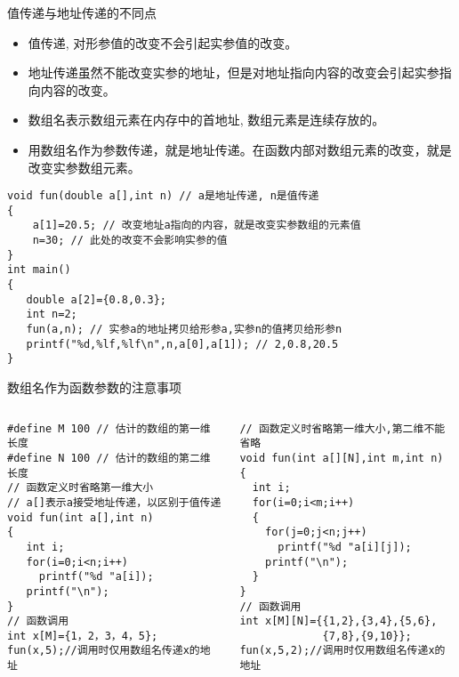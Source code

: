 \begin{frame}{值传递与地址传递的不同点}
\vspace{-0.2cm}
\begin{itemize}
	\item 值传递, 对形参值的改变不会引起实参值的改变。
	\item 地址传递虽然不能改变实参的地址，但是对地址指向内容的改变会引起实参指向内容的改变。
	\item 数组名表示数组元素在内存中的首地址, 数组元素是连续存放的。
	\item 用数组名作为参数传递，就是地址传递。在函数内部对数组元素的改变，就是改变实参数组元素。
\end{itemize}
\begin{lstlisting}
void fun(double a[],int n) // a是地址传递, n是值传递
{
    a[1]=20.5; // 改变地址a指向的内容，就是改变实参数组的元素值
    n=30; // 此处的改变不会影响实参的值
}
int main()
{
   double a[2]={0.8,0.3};
   int n=2;
   fun(a,n); // 实参a的地址拷贝给形参a,实参n的值拷贝给形参n
   printf("%d,%lf,%lf\n",n,a[0],a[1]); // 2,0.8,20.5
}
\end{lstlisting}
\end{frame}

\begin{frame}{数组名作为函数参数的注意事项}
\vspace{-0.2cm}
\begin{columns}[T]
\begin{lstlisting}
#define M 100 // 估计的数组的第一维长度
#define N 100 // 估计的数组的第二维长度
// 函数定义时省略第一维大小
// a[]表示a接受地址传递，以区别于值传递
void fun(int a[],int n)
{
   int i;
   for(i=0;i<n;i++) 
     printf("%d "a[i]);
   printf("\n");
}
// 函数调用
int x[M]={1，2，3，4，5};
fun(x,5);//调用时仅用数组名传递x的地址
\end{lstlisting}
\begin{lstlisting}[frame=leftline]
// 函数定义时省略第一维大小,第二维不能省略
void fun(int a[][N],int m,int n)
{
  int i;
  for(i=0;i<m;i++)
  {
    for(j=0;j<n;j++) 
      printf("%d "a[i][j]);
    printf("\n");
  }
}
// 函数调用
int x[M][N]={{1,2},{3,4},{5,6},
             {7,8},{9,10}};
fun(x,5,2);//调用时仅用数组名传递x的地址
\end{lstlisting}
\end{columns}
~\\
\end{frame}

